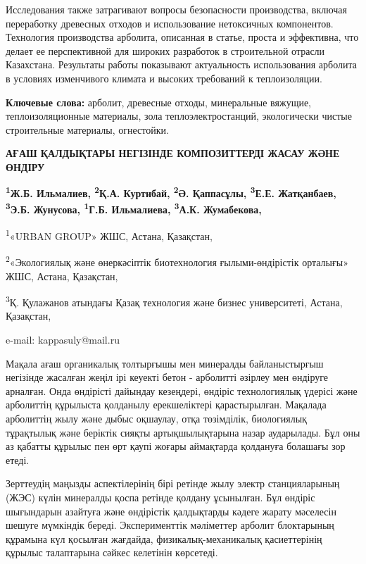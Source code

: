 Исследования также затрагивают вопросы безопасности производства,
включая переработку древесных отходов и использование нетоксичных
компонентов. Технология производства арболита, описанная в статье,
проста и эффективна, что делает ее перспективной для широких разработок
в строительной отрасли Казахстана. Результаты работы показывают
актуальность использования арболита в условиях изменчивого климата и
высоких требований к теплоизоляции.

{\bfseries Ключевые слова:} арболит, древесные отходы, минеральные вяжущие,
теплоизоляционные материалы, зола теплоэлектростанций, экологически
чистые строительные материалы, огнестойки.

\begin{articleheader}
{\bfseries АҒАШ ҚАЛДЫҚТАРЫ НЕГІЗІНДЕ КОМПОЗИТТЕРДІ ЖАСАУ ЖӘНЕ ӨНДІРУ}

{\bfseries
\textsuperscript{1}Ж.Б. Ильмалиев,
\textsuperscript{2}Қ.А. Куртибай,
\textsuperscript{2}Ә. Қаппасұлы\textsuperscript{\envelope },
\textsuperscript{3}Е.Е. Жатқанбаев,
\textsuperscript{3}Э.Б. Жунусова,
\textsuperscript{1}Г.Б. Ильмалиева,
\textsuperscript{3}А.К. Жумабекова,
}
\end{articleheader}

\begin{affiliation}
\textsuperscript{1}«URBAN GROUP» ЖШС, Астана, Қазақстан,

\textsuperscript{2}«Экологиялық және өнеркәсіптік биотехнология ғылыми-өндірістік орталығы» ЖШС, Астана, Қазақстан,

\textsuperscript{3}Қ. Қулажанов атындағы Қазақ технология және бизнес университеті, Астана, Қазақстан,

e-mail: kappasuly@mail.ru
\end{affiliation}

Мақала ағаш органикалық толтырғышы мен минералды байланыстырғыш
негізінде жасалған жеңіл ірі кеуекті бетон - арболитті әзірлеу мен
өндіруге арналған. Онда өндірісті дайындау кезеңдері, өндіріс
технологиялық үдерісі және арболиттің құрылыста қолданылу ерекшеліктері
қарастырылған. Мақалада арболиттің жылу және дыбыс оқшаулау, отқа
төзімділік, биологиялық тұрақтылық және беріктік сияқты артықшылықтарына
назар аударылады. Бұл оны аз қабатты құрылыс пен өрт қаупі жоғары
аймақтарда қолдануға болашағы зор етеді.

Зерттеудің маңызды аспектілерінің бірі ретінде жылу электр
станцияларының (ЖЭС) күлін минералды қоспа ретінде қолдану ұсынылған.
Бұл өндіріс шығындарын азайтуға және өндірістік қалдықтарды кәдеге
жарату мәселесін шешуге мүмкіндік береді. Эксперименттік мәліметтер
арболит блоктарының құрамына күл қосылған жағдайда,
физикалық-механикалық қасиеттерінің құрылыс талаптарына сәйкес келетінін
көрсетеді.


